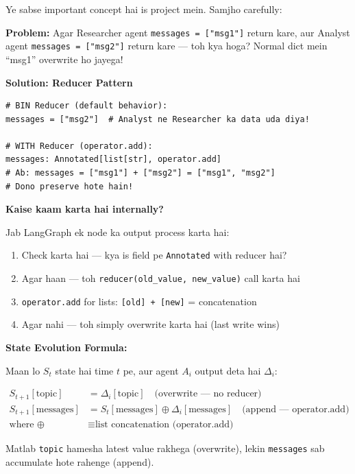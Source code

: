 \documentclass[12pt, a4paper]{article}
\begin{document}
\begin{conceptbox}[title={\faIcon{brain} ~Annotated Reducer --- Core LangGraph Concept}]
Ye sabse important concept hai is project mein. Samjho carefully:

\textbf{Problem:} Agar Researcher agent \texttt{messages = ["msg1"]} return kare, aur Analyst agent \texttt{messages = ["msg2"]} return kare --- toh kya hoga? Normal dict mein ``msg1'' overwrite ho jayega!

\textbf{Solution: Reducer Pattern}
\begin{lstlisting}[style=pythonstyle]
# BIN Reducer (default behavior):
messages = ["msg2"]  # Analyst ne Researcher ka data uda diya!

# WITH Reducer (operator.add):
messages: Annotated[list[str], operator.add]
# Ab: messages = ["msg1"] + ["msg2"] = ["msg1", "msg2"]
# Dono preserve hote hain!
\end{lstlisting}

\textbf{Kaise kaam karta hai internally?}

Jab LangGraph ek node ka output process karta hai:
\begin{enumerate}
\item Check karta hai --- kya is field pe \texttt{Annotated} with reducer hai?
\item Agar haan --- toh \texttt{reducer(old\_value, new\_value)} call karta hai
\item \texttt{operator.add} for lists: \texttt{[old] + [new]} = concatenation
\item Agar nahi --- toh simply overwrite karta hai (last write wins)
\end{enumerate}
\end{conceptbox}

\begin{mathbox}
\textbf{State Evolution Formula:}

Maan lo $S_t$ state hai time $t$ pe, aur agent $A_i$ output deta hai $\Delta_i$:

\begin{align}
S_{t+1}[\text{topic}] &= \Delta_i[\text{topic}] \quad \text{(overwrite --- no reducer)} \\
S_{t+1}[\text{messages}] &= S_t[\text{messages}] \oplus \Delta_i[\text{messages}] \quad \text{(append --- operator.add)} \\
\text{where } \oplus &\equiv \text{list concatenation (operator.add)}
\end{align}

Matlab \texttt{topic} hamesha latest value rakhega (overwrite), lekin \texttt{messages} sab accumulate hote rahenge (append).
\end{mathbox}
\end{document}
